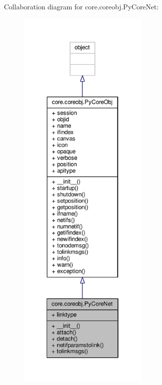 Collaboration diagram for core.\+coreobj.\+Py\+Core\+Net\+:
\nopagebreak
\begin{figure}[H]
\begin{center}
\leavevmode
\includegraphics[height=550pt]{classcore_1_1coreobj_1_1_py_core_net__coll__graph}
\end{center}
\end{figure}
